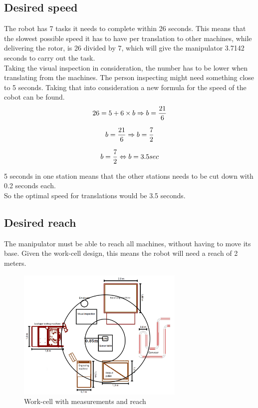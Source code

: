 \subsection{Desired speed}

The robot has 7 tasks it needs to complete within 26 seconds. This means that the slowest possible speed it has to have per translation to other machines, while delivering the rotor, is 26 divided by 7, which will give the manipulator 3.7142 seconds to carry out the task.\\
Taking the visual inspection in consideration, the number has to be lower when translating from the machines. The person inspecting might need something close to 5 seconds. Taking that into consideration a new formula for the speed of the cobot can be found.\\

\begin{equation}
    26 = 5 + 6 \times b \Rightarrow b = \frac{21}{6}\\
\end{equation}

\begin{equation}
    b = \frac{21}{6} \Rightarrow b = \frac{7}{2}\\
\end{equation}

\begin{equation}
    b = \frac{7}{2} \Leftrightarrow  b = 3.5 sec\\
\end{equation}

5 seconds in one station means that the other stations needs to be cut down with 0.2 seconds each.\\
So the optimal speed for translations would be 3.5 seconds.\\

\subsection{Desired reach}

The manipulator must be able to reach all machines, without having to move its base. Given the work-cell design, this means the robot will need a reach of 2 meters. \\
\begin{figure}[h]
    \centering
    \includegraphics[width=8cm]{Design/Work_cell_3.png}
    \caption{Work-cell with measurements and reach}
    \label{fig:workcell}
\end{figure}

